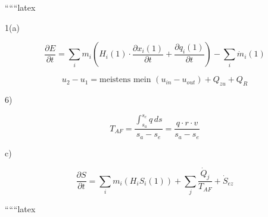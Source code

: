 
``````latex


1(a)

\[
\frac{\partial E}{\partial t} = \sum_i m_i (H_i(1) \cdot \frac{\partial x_i(1)}{\partial t} + \frac{\partial q_i(1)}{\partial t}) - \sum_i \dot{m}_i(1)
\]

\[
u_2 - u_1 = \text{meistens mein } (u_{in} - u_{out}) + Q_{zu} + Q_{R}
\]

6)

\[
T_{AF} = \frac{\int_{s_a}^{s_e} q \, ds}{s_a - s_e} = \frac{q \cdot r \cdot v}{s_a - s_e}
\]

c)

\[
\frac{\partial S}{\partial t} = \sum_i m_i (H_i S_i (1)) + \sum_j \frac{\dot{Q}_j}{T_{AF}} + \dot{S}_{ez}
\]

``````latex



